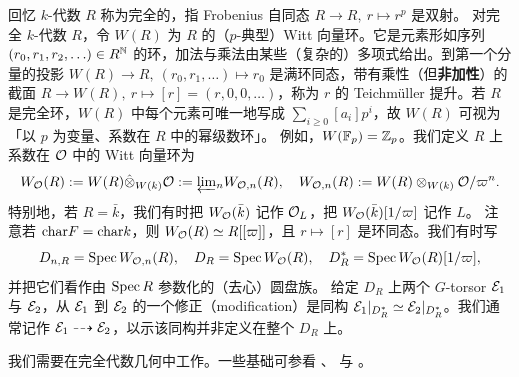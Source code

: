 回忆 $k$-代数 $R$ 称为完全的，指 Frobenius 自同态 $R\to R, \ r\mapsto r^p$ 是双射。
对完全 $k$-代数 $R$，令 $W(R)$ 为 $R$ 的（$p$-典型）Witt 向量环。它是元素形如序列 $(r_0,r_1,r_2,\ldots)\in R^{{\mathbb N}}$ 的环，加法与乘法由某些（复杂的）多项式给出。到第一个分量的投影 $W(R)\to R, \ (r_0,r_1,\ldots)\mapsto r_0$ 是满环同态，带有乘性（但\textbf{非加性}）的截面 $R\to W(R), \ r\mapsto [r]=(r,0,0,\ldots)$，称为 $r$ 的 Teichm\"uller 提升。若 $R$ 是完全环，$W(R)$ 中每个元素可唯一地写成 $\sum_{i\geq 0} [a_i]p^i$，故 $W(R)$ 可视为「以 $p$ 为变量、系数在 $R$ 中的幂级数环」。
例如，$W({\mathbb F}_p)={\mathbb Z}_p$。我们定义 $R$ 上系数在 ${\mathcal O}$ 中的 Witt 向量环为
\begin{equation}\label{ramified Witt vector}
W_{\mathcal O}(R):= W(R)\hat\otimes_{W(k)}{\mathcal O}:= \underleftarrow\lim_n W_{{\mathcal O},n}(R),\quad W_{{\mathcal O},n}(R):=W(R)\otimes_{W(k)} {\mathcal O}/\varpi^n.
\end{equation}
特别地，若 $R=\bar k$，我们有时把 $W_{\mathcal O}(\bar k)$ 记作 ${\mathcal O}_L$，把 $W_{{\mathcal O}}(\bar k)[1/\varpi]$ 记作 $L$。
注意若 ${\operatorname{char}} F={\operatorname{char}} k$，则 $W_{\mathcal O}(R)\simeq R[[\varpi]]$，且 $r\mapsto [r]$ 是环同态。我们有时写
\begin{equation}\label{discs}
D_{n,R}=\operatorname{Spec} W_{{\mathcal O},n}(R),\quad D_R=\operatorname{Spec} W_{\mathcal O}(R),\quad D_R^*=\operatorname{Spec} W_{\mathcal O}(R)[1/\varpi],
\end{equation}
并把它们看作由 $\operatorname{Spec} R$ 参数化的（去心）圆盘族。
给定 $D_R$ 上两个 $G$-torsor ${\mathcal E}_1$ 与 ${\mathcal E}_2$，从 ${\mathcal E}_1$ 到 ${\mathcal E}_2$ 的一个修正（modification）是同构 ${\mathcal E}_1|_{D_R^*}\simeq {\mathcal E}_2|_{D_R^*}$。我们通常记作 ${\mathcal E}_1\dashrightarrow{\mathcal E}_2$，以示该同构并非定义在整个 $D_R$ 上。

我们需要在完全代数几何中工作。一些基础可参看 \cite[附录 A]{Zh1}、\cite{BS} 与 \cite[\S A.1]{XZ}。
